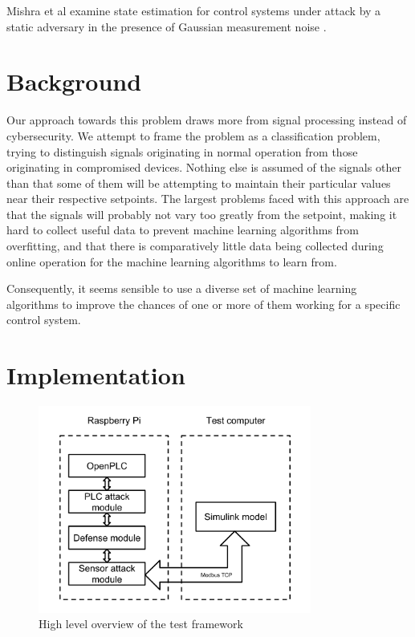 \documentclass[10pt,twocolumn]{IEEEtran}
\begin{document}
Mishra et al examine state estimation for control systems under attack by a static adversary in the presence of Gaussian measurement noise \cite{noise}.

\section{Background} \label{sec:bg}
Our approach towards this problem draws more from signal processing instead of cybersecurity.
We attempt to frame the problem as a classification problem, trying to distinguish signals originating in normal operation from those originating in compromised devices.
Nothing else is assumed of the signals other than that some of them will be attempting to maintain their particular values near their respective setpoints.
The largest problems faced with this approach are that the signals will probably not vary too greatly from the setpoint, making it hard to collect useful data to prevent machine learning algorithms from overfitting, and that there is comparatively little data being collected during online operation for the machine learning algorithms to learn from.

Consequently, it seems sensible to use a diverse set of machine learning algorithms to improve the chances of one or more of them working for a specific control system.

\section{Implementation} \label{sec:impl}
\begin{figure}
  \centering
  \includegraphics[width=0.8\textwidth]{csaw2017architecture.png}
  \caption{High level overview of the test framework}
  \label{fig:arch}
\end{figure}
\end{document}
